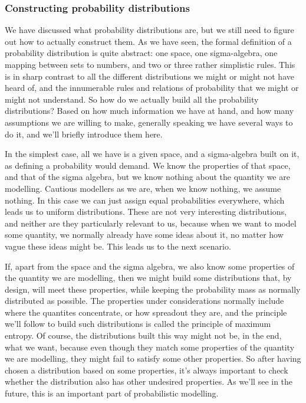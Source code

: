 \documentclass[11pt]{article}
\begin{document}
\subsubsection{Constructing probability distributions}
\label{sec:org7e824e5}

We have discussed what probability distributions are, but we still need to figure out how to actually construct them. As we have seen, the formal definition of a probability distribution is quite abstract: one space, one sigma-algebra, one mapping between sets to numbers, and two or three rather simplistic rules. This is in sharp contrast to all the different distributions we might or might not have heard of, and the innumerable rules and relations of probability that we might or might not understand. So how do we actually build all the probability distributions? Based on how much information we have at hand, and how many assumptions we are willing to make, generally speaking we have several ways to do it, and we'll briefly introduce them here.

In the simplest case, all we have is a given space, and a sigma-algebra built on it, as defining a probability would demand. We know the properties of that space, and that of the sigma algebra, but we know nothing about the quantity we are modelling. Cautious modellers as we are, when we know nothing, we assume nothing. In this case we can just assign equal probabilities everywhere, which leads us to uniform distributions. These are not very interesting distributions, and neither are they particularly relevant to us, because when we want to model some quantity, we normally already have some ideas about it, no matter how vague these ideas might be. This leads us to the next scenario.

If, apart from the space and the sigma algebra, we also know some properties of the quantity we are modelling, then we might build some distributions that, by design, will meet these properties, while keeping the probability mass as normally distributed as possible. The properties under considerations normally include where the quantites concentrate, or how spreadout they are, and the principle we'll follow to build such distributions is called the principle of maximum entropy. Of course, the distributions built this way might not be, in the end, what we want, because even though they match some properties of the quantity we are modelling, they might fail to satisfy some other properties. So after having chosen a distribution based on some properties, it's always important to check whether the distribution also has other undesired properties. As we'll see in the future, this is an important part of probabilistic modelling.
\end{document}
